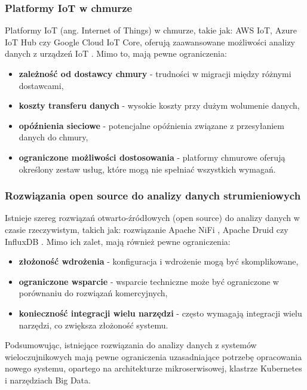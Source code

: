 \subsubsection{Platformy IoT w chmurze}
\label{subsubsec:cloud_iot}

Platformy IoT (ang. Internet of Things) w chmurze, takie jak: AWS IoT, Azure IoT Hub czy Google Cloud IoT Core, oferują zaawansowane możliwości analizy danych z
urządzeń IoT \cite{cloud_iot}. Mimo to, mają pewne ograniczenia:

\begin{itemize}
    \item \textbf{zależność od dostawcy chmury} - trudności w migracji między różnymi dostawcami,
    \item \textbf{koszty transferu danych} - wysokie koszty przy dużym wolumenie danych,
    \item \textbf{opóźnienia sieciowe} - potencjalne opóźnienia związane z przesyłaniem danych do chmury,
    \item \textbf{ograniczone możliwości dostosowania} - platformy chmurowe oferują określony zestaw usług, które mogą nie spełniać wszystkich wymagań.
\end{itemize}

\subsubsection{Rozwiązania open source do analizy danych strumieniowych}
\label{subsubsec:open_source}

Istnieje szereg rozwiązań otwarto-źródłowych (open source) do analizy danych w czasie rzeczywistym, takich jak: rozwiązanie Apache NiFi \cite{apache_nifi},
Apache Druid \cite{apache_druid} czy InfluxDB \cite{influxdb}. Mimo ich zalet, mają również pewne ograniczenia:

\begin{itemize}
    \item \textbf{złożoność wdrożenia} - konfiguracja i wdrożenie mogą być skomplikowane,
    \item \textbf{ograniczone wsparcie} - wsparcie techniczne może być ograniczone w porównaniu do rozwiązań komercyjnych,
    \item \textbf{konieczność integracji wielu narzędzi} - często wymagają integracji wielu narzędzi, co zwiększa złożoność systemu.
\end{itemize}

Podsumowując, istniejące rozwiązania do analizy danych z systemów wieloczujnikowych mają pewne ograniczenia uzasadniające potrzebę opracowania nowego systemu, opartego na architekturze mikroserwisowej, klastrze Kubernetes i narzędziach Big Data.